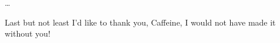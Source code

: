 

\begin{acknowledgements}
\dots{}

Last but not least I'd like to thank you, Caffeine, I would not have made it without you!


\end{acknowledgements}
